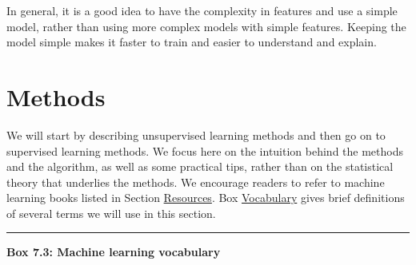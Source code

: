 \documentclass[]{krantz}
\begin{document}
In general, it is a good idea to have the complexity in features and use
a simple model, rather than using more complex models with simple
features. Keeping the model simple makes it faster to train and easier
to understand and explain.

\section{Methods}\label{methods}

We will start by describing unsupervised learning methods and then go on
to supervised learning methods. We focus here on the intuition behind
the methods and the algorithm, as well as some practical tips, rather
than on the statistical theory that underlies the methods. We encourage
readers to refer to machine learning books listed in Section
\protect\hyperlink{ml:res}{Resources}. Box
\protect\hyperlink{box:ml3}{Vocabulary} gives brief definitions of
several terms we will use in this section.

\begin{center}\rule{0.5\linewidth}{\linethickness}\end{center}

\textbf{Box 7.3: Machine learning vocabulary}
\end{document}
